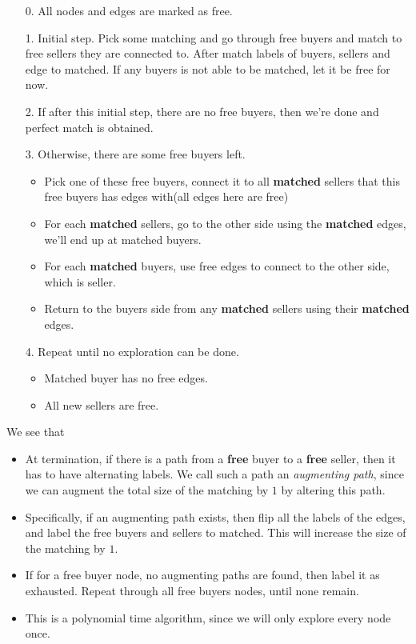 \begin{enumerate}
	\item[0.] All nodes and edges are marked as free.
	\item[1.] Initial step. Pick some matching and go through free buyers and match to free sellers they are connected to.
		After match labels of buyers, sellers and edge to matched. If any buyers is not able to be matched, let it be free for now.
	\item[2.] If after this initial step, there are no free buyers, then we're done and perfect match is obtained.
	\item[3.] Otherwise, there are some free buyers left.
		\begin{itemize}
			\item Pick one of these free buyers, connect it to all \textbf{matched} sellers that this free buyers has edges with(all edges here are free)
			\item For each \textbf{matched} sellers, go to the other side using the \textbf{matched} edges, we'll end up at matched buyers.
			\item For each \textbf{matched} buyers, use free edges to connect to the other side, which is seller.
			\item Return to the buyers side from any \textbf{matched} sellers using their \textbf{matched} edges.
		\end{itemize}
	\item[4.] Repeat until no exploration can be done.
		\begin{itemize}
			\item Matched buyer has no free edges.
			\item All new sellers are free.
		\end{itemize}
\end{enumerate}
\begin{remark}
	We see that
	\begin{itemize}
		\item At termination, if there is a path from a \textbf{free} buyer to a \textbf{free} seller, then it has to have alternating labels. We
		      call such a path an \emph{augmenting path}, since we can augment the total size of the matching by \(1\) by altering this path.
		\item Specifically, if an augmenting path exists, then flip all the labels of the edges, and label the free buyers and sellers to matched. This
		      will increase the size of the matching by \(1\).
		\item If for a free buyer node, no augmenting paths are found, then label it as exhausted. Repeat through all free buyers nodes, until none remain.
		\item This is a polynomial time algorithm, since we will only explore every node once.
	\end{itemize}
\end{remark}

